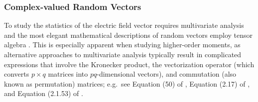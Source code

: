 \documentclass[twocolumn]{aastex6}
\begin{document}


\subsubsection{Complex-valued Random Vectors}
\label{sec:multivariate_statistics}

To study the statistics of the electric field vector requires
multivariate analysis and the most elegant mathematical descriptions
of random vectors employ tensor algebra \citep[e.g.][]{mcc87,agl96a,smi11}.
%
This is especially apparent when studying higher-order moments,
as alternative approaches to multivariate analysis typically result
in complicated expressions that involve the Kronecker product, the
vectorization operator (which converts $p\times q$ matrices into
$pq$-dimensional vectors), and commutation (also known as permutation)
matrices; e.g.\ see
Equation (50) of \citet{men91}, 
Equation (2.17) of \citet{st96}, and
Equation (2.1.53) of \citet{kr05}.
\end{document}
